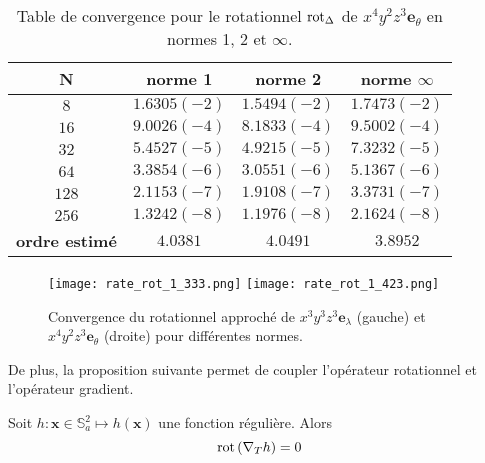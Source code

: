 \begin{table}[htbp]
\begin{center}
\begin{tabular}{|c||c|c|c|}
\hline
\textbf{N}  & \textbf{norme 1} & \textbf{norme 2} & \textbf{norme $\infty$} \\
\hline
\hline
$8$  & $1.6305(-2)$ & $1.5494(-2)$ & $1.7473(-2)$  \\
$16$ & $9.0026(-4)$ & $8.1833(-4)$ & $9.5002(-4)$  \\
$32$ & $5.4527(-5)$ & $4.9215(-5)$ & $7.3232(-5)$  \\
$64$ & $3.3854(-6)$ & $3.0551(-6)$ & $5.1367(-6)$  \\
$128$& $2.1153(-7)$ & $1.9108(-7)$ & $3.3731(-7)$  \\
$256$& $1.3242(-8)$ & $1.1976(-8)$ & $2.1624(-8)$  \\
\hline 
\hline
\textbf{ordre estimé}& $4.0381$ & $4.0491$ & $3.8952$\\
\hline
\end{tabular}
\end{center}
\caption{Table de convergence pour le rotationnel $\text{rot}_{\Delta}$ de $ x^4 y^2 z^3 \mathbf{e}_{\theta}$ en normes 1, 2 et $\infty$.}
\label{tab:rate_rot2}
\end{table} 

\begin{figure}[htbp]
\begin{center}
\texttt{[image: rate\_rot\_1\_333.png]}
\texttt{[image: rate\_rot\_1\_423.png]}
\end{center}
\caption{Convergence du rotationnel approché de $ x^3 y^3 z^3 \mathbf{e}_{\lambda}$ (gauche) et $ x^4 y^2 z^3 \mathbf{e}_{\theta}$ (droite) pour différentes normes.}
\label{fig:rate_rot}
\end{figure}

De plus, la proposition suivante permet de coupler l'opérateur rotationnel et l'opérateur gradient.

\begin{proposition}
Soit $h : \mathbf{x} \in \mathbb{S}_a^2 \mapsto h(\mathbf{x})$ une fonction régulière. Alors 
\begin{equation}
\text{rot} \left( \nabla_T h \right) = 0
\end{equation}
\label{prop:rot_grad}
\end{proposition}

